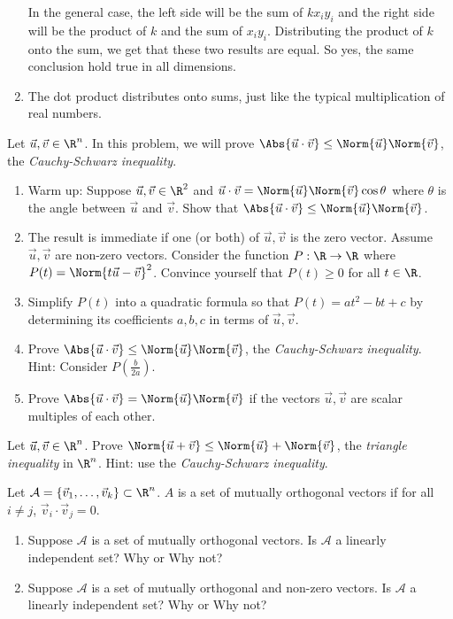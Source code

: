 \begin{exercises}
\begin{problist}
\begin{solution}
\begin{enumerate}
				In the general case, the left side will be the sum of $kx_iy_i$ and the right side will 
				be the product of $k$ and the sum of $x_iy_i$. Distributing the product of $k$ onto the 
				sum, we get that these two results are equal. So yes, the same conclusion hold true in 
				all dimensions.
				
				\item The dot product distributes onto sums, just like the typical multiplication of 
				real numbers.
			\end{enumerate}
		\end{solution}
        
        \prob Let $\vec u, \vec v \in \R^n$. In this problem, we will prove $\Abs{\vec u \cdot \vec v} \leq \Norm{\vec u}\Norm{\vec v}$, the \emph{Cauchy-Schwarz inequality}.
       \begin{enumerate}
           \item Warm up: Suppose $\vec u, \vec v \in \R^2$ and $\vec u \cdot \vec v = \Norm{\vec u}\Norm{\vec v}\cos \theta$ where $\theta$ is the angle between $\vec u$ and $\vec v$. Show that $\Abs{\vec u \cdot \vec v} \leq \Norm{\vec u}\Norm{\vec v}$.
           \item The result is immediate if one (or both) of $\vec u, \vec v$ is the zero vector. Assume $\vec u, \vec v$ are non-zero vectors. Consider the function $P: \R \to \R$ where $P(t) = \Norm{t\vec u - \vec v}^2$. Convince yourself that $P(t) \geq 0$ for all $t \in \R$.
           \item Simplify $P(t)$ into a quadratic formula so that $P(t) = at^2 - bt + c$ by determining its coefficients $a, b, c$ in terms of $\vec u, \vec v$.
           \item Prove $\Abs{\vec u \cdot \vec v} \leq \Norm{\vec u}\Norm{\vec v}$, the \emph{Cauchy-Schwarz inequality}. Hint: Consider $P(\frac{b}{2a})$.
           \item Prove $\Abs{\vec u \cdot \vec v} = \Norm{\vec u}\Norm{\vec v}$ if the vectors $\vec u, \vec v$ are scalar multiples of each other.
       \end{enumerate}
       
       \prob Let $\vec u, \vec v \in \R^n$. Prove $\Norm{\vec u + \vec v} \leq \Norm{\vec u} + \Norm{\vec v}$, the \emph{triangle inequality} in $\R^n$.
       Hint: use the \emph{Cauchy-Schwarz inequality}.
       
       \prob Let $\mathcal {A} = \{\vec v_1,\dots , \vec v_k\} \subset \R^n$. $A$ is a set of mutually orthogonal vectors if for all $i \neq j$, $\vec v_i \cdot \vec v_j = 0$. 
       \begin{enumerate}
           \item Suppose $\mathcal{A}$ is a set of mutually orthogonal vectors. Is $\mathcal{A}$ a linearly independent set? Why or Why not?
           \item Suppose $\mathcal{A}$ is a set of mutually orthogonal and non-zero vectors. Is $\mathcal{A}$ a linearly independent set? Why or Why not?
       \end{enumerate}
	\end{problist}
\end{exercises}
